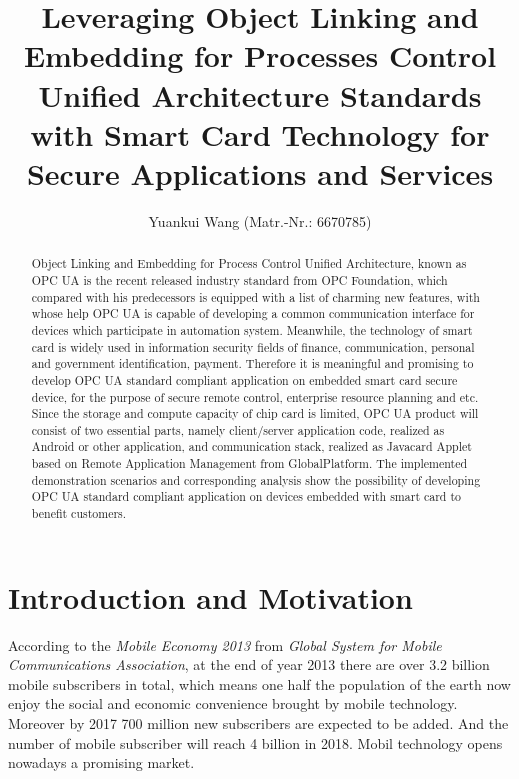 \documentclass[]{llncs}
\begin{document}
\title{Leveraging Object Linking and Embedding for Processes Control Unified Architecture Standards with Smart Card Technology for Secure Applications and Services} %
\author{Yuankui Wang (Matr.-Nr.: 6670785)}

\maketitle

\begin{abstract}

Object Linking and Embedding for Process Control Unified Architecture, known as OPC UA is the recent released industry standard from OPC Foundation, which compared with his predecessors is equipped with a list of charming new features, with whose help OPC UA is capable of developing a common communication interface for devices which participate in automation system. Meanwhile, the technology of smart card is widely used in information security fields of finance, communication, personal and government identification, payment. Therefore it is meaningful and promising to develop OPC UA standard compliant application on embedded smart card secure device, for the purpose of secure remote control, enterprise resource planning and etc. Since the storage and compute capacity of chip card is limited, OPC UA product will consist of two essential parts, namely client/server application code, realized as Android or other application, and communication stack, realized as Javacard Applet based on Remote Application Management from GlobalPlatform. The implemented demonstration scenarios and corresponding analysis show the possibility of developing OPC UA standard compliant application on devices embedded with smart card to benefit customers. 
\end{abstract}

\section{Introduction and Motivation}
According to the \emph{Mobile Economy 2013} from \emph{Global System for Mobile Communications Association}, at the end of year 2013 there are over 3.2 billion mobile   subscribers in total, which means one half the population of the earth now enjoy the social and economic convenience brought by mobile technology. Moreover by 2017 700 million new subscribers are expected to be added. And the number of mobile subscriber will reach 4 billion in 2018. Mobil technology opens nowadays a promising market. 
\end{document}
